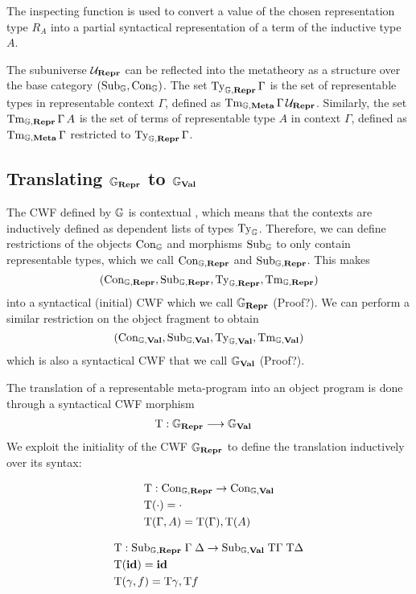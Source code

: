 The inspecting function is used to convert a value of the chosen representation
type $R_A$ into a partial syntactical representation of a term of the inductive
type $A$.

The subuniverse ${{\mathcal{U}_{{\textbf{Repr}}}}}$ can be reflected into the metatheory as a structure over
the base category $(\text{Sub}_{{\mathbb{G}}}, \text{Con}_{{\mathbb{G}}})$. The set
$\text{Ty}_{{\mathbb{G}},\textbf{Repr}}\,\Gamma$ is the set of representable types in representable
context $\Gamma$, defined as $\text{Tm}_{{\mathbb{G}},\textbf{Meta}}\,\Gamma\,{{\mathcal{U}_{{\textbf{Repr}}}}}$. Similarly, the set
$\text{Tm}_{{\mathbb{G}},\textbf{Repr}}\,\Gamma\,A$ is the set of terms of representable type $A$ in
context $\Gamma$, defined as $\text{Tm}_{{\mathbb{G}},\textbf{Meta}}\,\Gamma$ restricted to
$\text{Ty}_{{\mathbb{G}},\textbf{Repr}}\,\Gamma$.

\subsection{Translating ${\mathbb{G}}_{\textbf{Repr}}$ to ${\mathbb{G}}_{\textbf{Val}}$}

The CWF defined by ${\mathbb{G}}$ is contextual \cite{Castellan2019-sh}, which means
that the contexts are inductively defined as dependent lists of types
$\text{Ty}_\mathbb{G}$. Therefore, we can define restrictions of the objects
$\text{Con}_{{\mathbb{G}}}$ and morphisms $\text{Sub}_{{\mathbb{G}}}$ to only contain representable
types, which we call $\text{Con}_{{\mathbb{G}},\textbf{Repr}}$ and $\text{Sub}_{{\mathbb{G}},\textbf{Repr}}$. This makes
\[
  (\text{Con}_{{\mathbb{G}}, \textbf{Repr}}, \text{Sub}_{{\mathbb{G}}, \textbf{Repr}}, \text{Ty}_{{\mathbb{G}}, \textbf{Repr}}, \text{Tm}_{{\mathbb{G}}, \textbf{Repr}})
\]
into a syntactical (initial) CWF which we call ${\mathbb{G}}_{\textbf{Repr}}$ (Proof?). We can
perform a similar restriction on the object fragment to obtain
\[
  (\text{Con}_{{\mathbb{G}}, \textbf{Val}}, \text{Sub}_{{\mathbb{G}}, \textbf{Val}}, \text{Ty}_{{\mathbb{G}}, \textbf{Val}}, \text{Tm}_{{\mathbb{G}}, \textbf{Val}})
\]
which is also a syntactical CWF that we call ${\mathbb{G}}_{\textbf{Val}}$ (Proof?).

The translation of a representable meta-program into an object program is done
through a syntactical CWF morphism
\begin{align*}
  \text{T} : {\mathbb{G}}_{\textbf{Repr}} & \longrightarrow {\mathbb{G}}_{\textbf{Val}}
\end{align*}
We exploit the initiality of the CWF ${\mathbb{G}}_{\textbf{Repr}}$ to define the translation
inductively over its syntax:

\begin{align*}
   & \text{T}            : \text{Con}_{{\mathbb{G}}, \textbf{Repr}} \to \text{Con}_{{\mathbb{G}}, \textbf{Val}} \\
   & \text{T}(\cdot)     = \cdot                                   \\
   & \text{T}(\Gamma, A) = \text{T}(\Gamma), \text{T}(A)
\end{align*}

\begin{align*}
   & \text{T}            : \text{Sub}_{{\mathbb{G}}, \textbf{Repr}} \; \Gamma \; \Delta \to \text{Sub}_{{\mathbb{G}}, \textbf{Val}}\; \text{T}\Gamma \; \text{T}\Delta \\
   & \text{T}(\textbf{id})  = \textbf{id}                                                                                   \\
   & \text{T}(\gamma, f) = \text{T} \gamma , \text{T} f
\end{align*}

